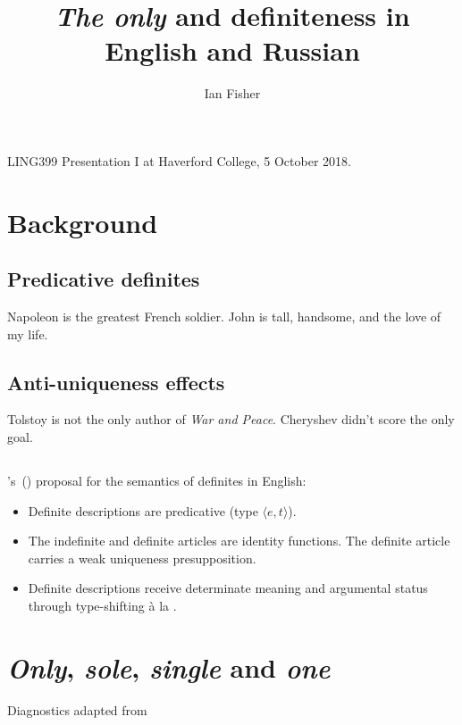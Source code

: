 \documentclass{article}
\title{\textit{The only} and definiteness in English and Russian}
\author{Ian Fisher}
\date{}
\newcommand{\citegen}[1]{\citeauthor{#1}'s~(\citeyear{#1})}
\begin{document}
\maketitle

\noindent LING399 Presentation I at Haverford College, 5 October 2018.

\section*{Background}
\subsection*{Predicative definites}
\begin{exe}
	\ex Napoleon is the greatest French soldier.
	\ex John is tall, handsome, and the love of my life.
\end{exe}

\subsection*{Anti-uniqueness effects}
\begin{exe}
	\ex Tolstoy is not the only author of \textit{War and Peace}.
	\ex Cheryshev didn't score the only goal.
\end{exe}

\subsection*{\citet{cb2015}}
\citegen{cb2015} proposal for the semantics of definites in English:

\begin{itemize}
	\item Definite descriptions are predicative (type $\langle e, t \rangle$).
	\item The indefinite and definite articles are identity functions. The definite article carries a weak uniqueness presupposition.
	\item Definite descriptions receive determinate meaning and argumental status through type-shifting \`{a} la \citet{partee86}.
\end{itemize}

\section*{\textit{Only}, \textit{sole}, \textit{single} and \textit{one}}
Diagnostics adapted from \citet{cb2012a}
\end{document}
